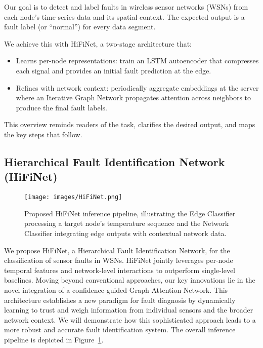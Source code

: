 Our goal is to detect and label faults in wireless sensor networks (WSNs) from each node’s time-series data and its spatial context. The expected output is a fault label (or “normal”) for every data segment.

We achieve this with HiFiNet, a two-stage architecture that:
\begin{itemize}
    \item Learns per-node representations: train an LSTM autoencoder that compresses each signal and provides an initial fault prediction at the edge.
    \item Refines with network context: periodically aggregate embeddings at the server where an Iterative Graph Network propagates attention across neighbors to produce the final fault labels.
\end{itemize}

This overview reminds readers of the task, clarifies the desired output, and maps the key steps that follow.

\subsection{Hierarchical Fault Identification Network (HiFiNet)}
\begin{figure}
  \centering
  \texttt{[image: images/HiFiNet.png]}
  \caption{Proposed HiFiNet inference pipeline, illustrating the Edge Classifier processing a target node's temperature sequence and the Network Classifier integrating edge outputs with contextual network data.}
  \label{fig:hifinet}
\end{figure}
We propose HiFiNet, a Hierarchical Fault Identification Network, for the classification of sensor faults in WSNs. HiFiNet jointly leverages per-node temporal features and network‐level interactions to outperform single-level baselines. Moving beyond conventional approaches, our key innovations lie in the novel integration of a confidence-guided Graph Attention Network. This architecture establishes a new paradigm for fault diagnosis by dynamically learning to trust and weigh information from individual sensors and the broader network context. We will demonstrate how this sophisticated approach leads to a more robust and accurate fault identification system. The overall inference pipeline is depicted in Figure~\ref{fig:hifinet}.

